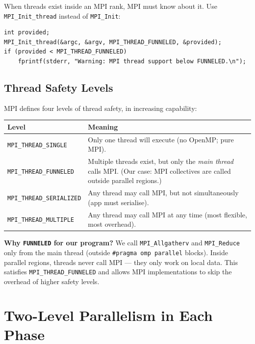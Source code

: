 \documentclass[12pt,a4paper]{article}
\begin{document}
When threads exist inside an MPI rank, MPI must know about it.  Use
\texttt{MPI\_Init\_thread} instead of \texttt{MPI\_Init}:

\begin{lstlisting}
int provided;
MPI_Init_thread(&argc, &argv, MPI_THREAD_FUNNELED, &provided);
if (provided < MPI_THREAD_FUNNELED)
    fprintf(stderr, "Warning: MPI thread support below FUNNELED.\n");
\end{lstlisting}

\subsection{Thread Safety Levels}

MPI defines four levels of thread safety, in increasing capability:

\begin{center}
\begin{tabular}{lp{8cm}}
\toprule
Level & Meaning \\
\midrule
\texttt{MPI\_THREAD\_SINGLE} &
  Only one thread will execute (no OpenMP; pure MPI). \\
\texttt{MPI\_THREAD\_FUNNELED} &
  Multiple threads exist, but only the \emph{main thread} calls MPI.
  (Our case: MPI collectives are called outside parallel regions.) \\
\texttt{MPI\_THREAD\_SERIALIZED} &
  Any thread may call MPI, but not simultaneously (app must serialise). \\
\texttt{MPI\_THREAD\_MULTIPLE} &
  Any thread may call MPI at any time (most flexible, most overhead). \\
\bottomrule
\end{tabular}
\end{center}

\textbf{Why \texttt{FUNNELED} for our program?}  We call
\texttt{MPI\_Allgatherv} and \texttt{MPI\_Reduce} only from the main thread
(outside \texttt{\#pragma omp parallel} blocks).  Inside parallel regions,
threads never call MPI — they only work on local data.  This satisfies
\texttt{MPI\_THREAD\_FUNNELED} and allows MPI implementations to skip the
overhead of higher safety levels.

\section{Two-Level Parallelism in Each Phase}
\end{document}
